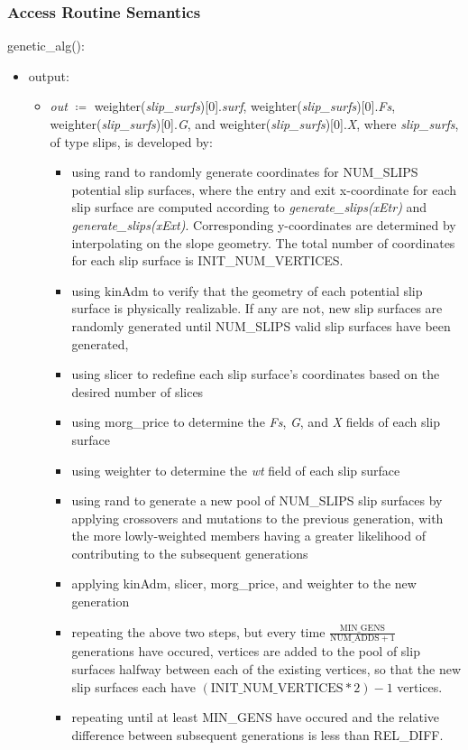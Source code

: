 \documentclass[12pt, titlepage]{article}
\begin{document}
\subsubsection{Access Routine Semantics}
genetic\_alg():
\begin{itemize}
	\item output:
	\begin{itemize}
	\item[] \textit{out} $\coloneqq$ 
	weighter(\textit{slip\_surfs})[0].\textit{surf}, 
	weighter(\textit{slip\_surfs})[0].\textit{Fs}, 
	weighter(\textit{slip\_surfs})[0].\textit{G}, 
	and weighter(\textit{slip\_surfs})[0].\textit{X}, where 
	\textit{slip\_surfs}, of 
	type slips, is developed by:
	\begin{itemize}
		\item using rand to randomly generate coordinates for NUM\_SLIPS 
		potential slip surfaces, where the entry and exit x-coordinate for each 
		slip surface are computed according to \textit{generate\_slips(xEtr)} 
		and \textit{generate\_slips(xExt)}. Corresponding y-coordinates are 
		determined by interpolating on the slope geometry. The total number of 
		coordinates for each slip surface is INIT\_NUM\_VERTICES.
		\item using kinAdm to verify that the geometry of each potential slip 
		surface is physically realizable. If any are not, new slip surfaces are 
		randomly generated until NUM\_SLIPS valid slip surfaces have been 
		generated,
		\item using slicer to redefine each slip surface's coordinates based on 
		the desired number of slices
		\item using morg\_price to determine the \textit{Fs}, \textit{G}, and 
		\textit{X} fields of each slip 
		surface
		\item using weighter to determine the \textit{wt} field of each 
		slip surface
		\item using rand to generate a new pool of NUM\_SLIPS slip surfaces by 
		applying crossovers and mutations to the previous generation, with the 
		more lowly-weighted members having a greater likelihood of 
		contributing to the subsequent generations
		\item applying kinAdm, slicer, morg\_price, and weighter to the new 
		generation
		\item repeating the above two steps, but every time 
		$\frac{\text{MIN\_GENS}}{\text{NUM\_ADDS}+1}$ generations have occured, 
		vertices are added to the pool of slip surfaces halfway between each of 
		the existing vertices, so that the new slip surfaces each have 
		$(\text{INIT\_NUM\_VERTICES} * 2) - 1$ vertices. 
		\item repeating until at least MIN\_GENS have occured and the relative 
		difference between subsequent generations is less than REL\_DIFF.
	\end{itemize}
	\end{itemize}
\end{itemize}
\end{document}
